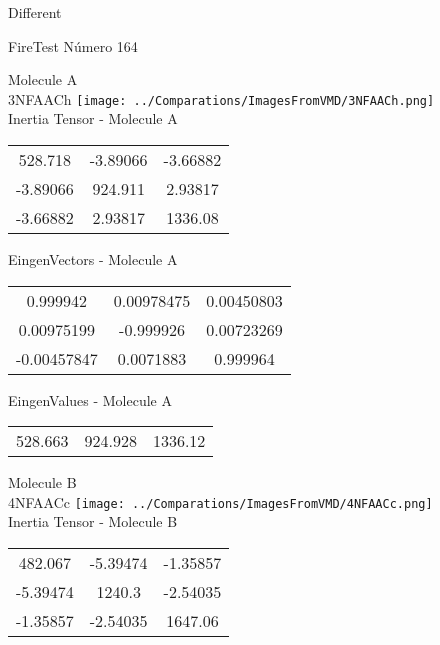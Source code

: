 \begin{center}
\vtab
\vtab
\textcolor{NavyBlue}{\Large Different}
\end{center}

 \newpage

\vtab[-2cm]
\begin{center}
{\large FireTest \tab Número 164}
\end{center}
\begin{multicols}{2}
\begin{center}

Molecule A \\ 
3NFAACh
\texttt{[image: ../Comparations/ImagesFromVMD/3NFAACh.png]}
\\
Inertia Tensor - Molecule A \\
\vtab

\begin{tabular}{|c c c|}
528.718	 & 	-3.89066	 & 	-3.66882	 \\
-3.89066	 & 	924.911	 & 	2.93817	 \\
-3.66882	 & 	2.93817	 & 	1336.08
\end{tabular}

\vtab
 EingenVectors - Molecule A     \\
\vtab
\begin{tabular}{|c c c|}
0.999942	 & 	0.00978475	 & 	0.00450803	 \\
0.00975199	 & 	-0.999926	 & 	0.00723269	 \\
-0.00457847	 & 	0.0071883	 & 	0.999964
\end{tabular}

\vtab
 EingenValues - Molecule A     \\
\vtab
\begin{tabular}{|c c c|}
528.663	 & 	924.928	 & 	1336.12	 \\
\end{tabular}
\columnbreak

Molecule B \\ 
4NFAACc
\texttt{[image: ../Comparations/ImagesFromVMD/4NFAACc.png]}
\\
Inertia Tensor - Molecule B \\
\vtab

\begin{tabular}{|c c c|}
482.067	 & 	-5.39474	 & 	-1.35857	 \\
-5.39474	 & 	1240.3	 & 	-2.54035	 \\
-1.35857	 & 	-2.54035	 & 	1647.06
\end{tabular}


\end{center}
\end{multicols}
